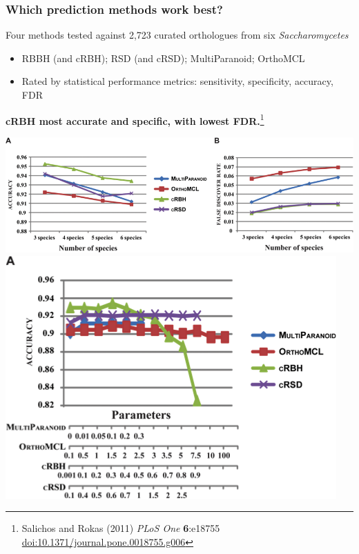 \begin{frame}
  \frametitle{Which prediction methods work best?}
  Four methods tested against 2,723 curated orthologues from six \textit{Saccharomycetes}
  \begin{itemize}
    \item RBBH (and cRBH); RSD (and cRSD); MultiParanoid; OrthoMCL
    \item Rated by statistical performance metrics: sensitivity, specificity, accuracy, FDR
  \end{itemize}
  \textbf{cRBH most accurate and specific, with lowest FDR.}\footnote{\tiny{Salichos and Rokas (2011) \textit{PLoS One} \textbf{6}:e18755 \href{http://dx.doi.org/10.1371/journal.pone.0018755.g006}{doi:10.1371/journal.pone.0018755.g006}}}
  \begin{center}
      \includegraphics[height=0.25\textheight]{images/salichos_results1} 
      \includegraphics[height=0.25\textheight]{images/salichos_results2}      
  \end{center}
\end{frame}

